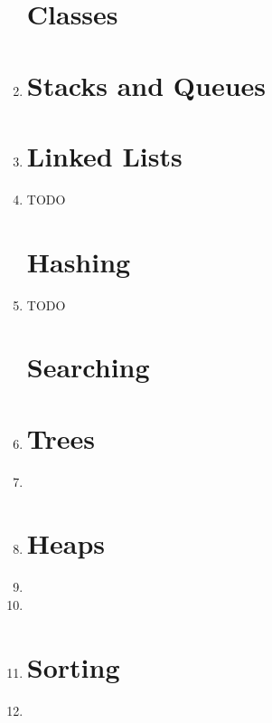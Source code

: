 \documentclass[11pt]{article}
\begin{document}
\begin{enumerate}
\newpage
\section*{Classes}
	\item 

\newpage
\section*{Stacks and Queues}
	\item 

\newpage
\section*{Linked Lists}
	\item TODO %

\section*{Hashing}
	\item TODO %

\section*{Searching}
	\item 

\newpage
\section*{Trees}
	\item 

\newpage
	\item 

\newpage
\section*{Heaps}
	\item 

	\item 

	\item 

\section*{Sorting}
	\item 


\end{enumerate}
\end{document}

